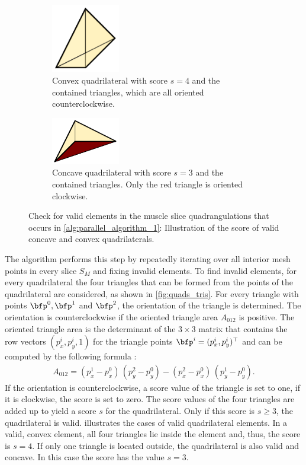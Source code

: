 \begin{figure}%
  \centering%
  \begin{subfigure}[t]{0.48\textwidth}%
    \centering%
    \includegraphics[width=3cm]{images/parallel_fiber_estimation/triangle_score_3.pdf}%
    \caption{Convex quadrilateral with score $s=4$ and the contained triangles, which are all oriented counterclockwise.}%
    \label{fig:triangle_score_3}%
  \end{subfigure}
  \quad
  \begin{subfigure}[t]{0.48\textwidth}%
    \centering%
    \includegraphics[width=3cm]{images/parallel_fiber_estimation/triangle_score_4.pdf}%
    \caption{Concave quadrilateral with score $s=3$ and the contained triangles. Only the red triangle is oriented clockwise.}%
    \label{fig:triangle_score_4}%
  \end{subfigure}   
  \caption{Check for valid elements in the muscle slice quadrangulations that occurs in \cref{alg:parallel_algorithm_1}: Illustration of the score of valid concave and convex quadrilaterals.}%
  \label{fig:triangle_score}%
\end{figure}%

The algorithm performs this step by repeatedly iterating over all interior mesh points in every slice $S_M$ and fixing invalid elements. To find invalid elements, for every quadrilateral the four triangles that can be formed from the points of the quadrilateral are considered, as shown in \cref{fig:quads_tris}.
For every triangle with points $\bfp^0,\bfp^1$ and $\bfp^2$, the orientation of the triangle is determined. The orientation is counterclockwise if the oriented triangle area $A_{012}$ is positive. The oriented triangle area is the determinant of the $3 \times 3$ matrix that contains the row vectors $(p^i_x,p^i_y,1)$ for the triangle points $\bfp^i=(p^i_x,p^i_y)^\top$ and can be computed by the following formula \cite{sedgewick2011algorithms}:
%
\begin{align*}
  A_{012} = (p^1_x-p^0_x)\,(p^2_y-p^0_y) - (p^2_x-p^0_x)\,(p^1_y-p^0_y).
\end{align*}
If the orientation is counterclockwise, a score value of the triangle is set to one, if it is clockwise, the score is set to zero. The score values of the four triangles are added up to yield a score $s$ for the quadrilateral. Only if this score is $s \geq 3$, the quadrilateral is valid.  illustrates the cases of valid quadrilateral elements. In a valid, convex element, all four triangles lie inside the element and, thus, the score is $s=4$. If only one triangle is located outside, the quadrilateral is also valid and concave. In this case the score has the value $s=3$.

